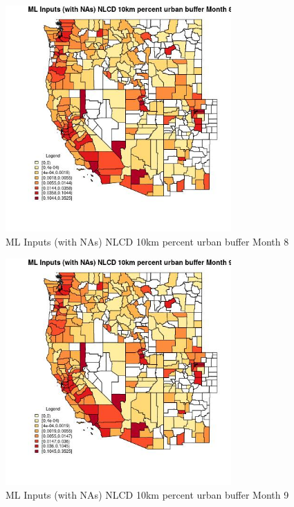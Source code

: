 \begin{figure} 
\centering  
\includegraphics[width=0.77\textwidth]{Code_Outputs/Report_ML_input_PM25_Step4_part_f_de_duplicated_aves_prioritize_24hr_obswNAs_CountyNLCD_10km_percent_urban_buffermedianMonth8.jpg} 
\caption{\label{fig:Report_ML_input_PM25_Step4_part_f_de_duplicated_aves_prioritize_24hr_obswNAsCountyNLCD_10km_percent_urban_buffermedianMonth8}ML Inputs (with NAs) NLCD 10km percent urban buffer Month 8} 
\end{figure} 
 

\begin{figure} 
\centering  
\includegraphics[width=0.77\textwidth]{Code_Outputs/Report_ML_input_PM25_Step4_part_f_de_duplicated_aves_prioritize_24hr_obswNAs_CountyNLCD_10km_percent_urban_buffermedianMonth9.jpg} 
\caption{\label{fig:Report_ML_input_PM25_Step4_part_f_de_duplicated_aves_prioritize_24hr_obswNAsCountyNLCD_10km_percent_urban_buffermedianMonth9}ML Inputs (with NAs) NLCD 10km percent urban buffer Month 9} 
\end{figure} 
 

